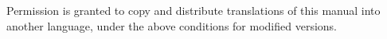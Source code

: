 \documentclass[11pt]{report}
\begin{document}
\noindent
Permission is granted to copy and distribute translations of this
manual into another language, under the above conditions for modified
versions.


\newpage

{\setlength{\parskip}{0pt}\tableofcontents}














\appendix












\end{document}

